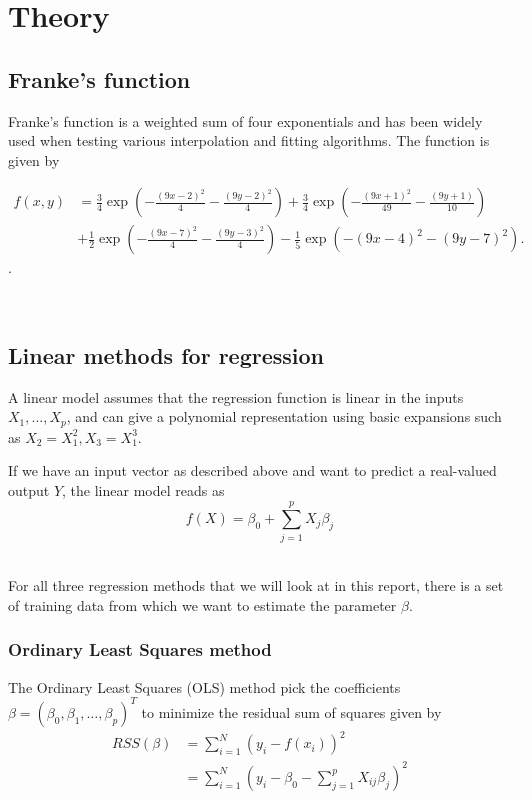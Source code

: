 \section{Theory}

\subsection{Franke's function}

Franke's function is a weighted sum of four exponentials and has been 
widely used when testing various interpolation and fitting algorithms.
The function is given by 

\begin{align*}
	f(x,y) &= 
	\frac{3}{4}\exp{\left(-\frac{(9x-2)^2}{4} 
	- \frac{(9y-2)^2}{4}\right)}
	+\frac{3}{4}\exp{\left(-\frac{(9x+1)^2}{49}
	- \frac{(9y+1)}{10}\right)} \\
	&+\frac{1}{2}\exp{\left(-\frac{(9x-7)^2}{4} 
	- \frac{(9y-3)^2}{4}\right)} 
	-\frac{1}{5}\exp{\left(-(9x-4)^2 - (9y-7)^2\right) }.
\end{align*}. 

~\cite{Project1}

\subsection{Linear methods for regression}

A linear model assumes that the regression function is linear in the 
inputs \(X_1, \dots, X_p\), and can give a polynomial representation
using basic expansions such as \(X_2 = X_1^2, X_3 = X_1^3\). 

If we have an input vector as described above and want to predict 
a real-valued output \(Y\), the linear model reads as
\begin{equation}
	f(X) = \beta_0 + \sum\limits_{j=1}^p X_j\beta_j
\end{equation}
~\cite{IntroStatistics}

For all three regression methods that we will look at in this report, 
there is a set of training data from which we want to estimate the parameter 
\(\beta\). 

\subsubsection{Ordinary Least Squares method}
The Ordinary Least Squares (OLS) method pick the coefficients
\(\beta = (\beta_0, \beta_1, \dots, \beta_p)^T\) to minimize the 
residual sum of squares given by
\begin{align}
	RSS(\beta) &= \sum\limits_{i=1}^N (y_i - f(x_i))^2\\
				&= \sum\limits_{i=1}^N 
				(y_i - \beta_0 - \sum\limits_{j=1}^p X_{ij}\beta_j )^2\\
\end{align}

